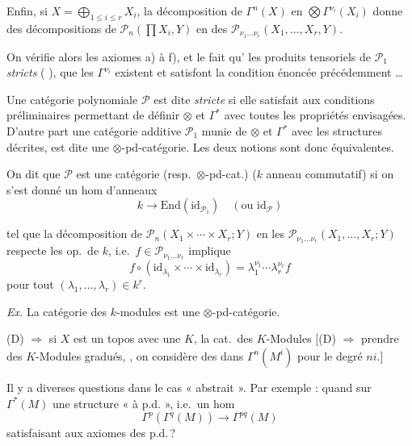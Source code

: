 \documentclass[11pt,a4paper]{article}
\begin{document}
Enfin, si $X = \bigoplus_{1 \leq i \leq r} X_i$, la décomposition de
$\Gamma^{n}(X)$ en  $\bigotimes \Gamma^{\nu_i}(X_i)$ donne
 des décompositions de $\mathcal{P}_n(\prod X_i, Y)$ en des
$\mathcal{P}_{\nu_1 \ldots \nu_r}(X_1, \ldots, X_r, Y)$.

On vérifie alors les axiomes a) à f), et le fait qu'
les produits tensoriels de $\mathcal{P}_1$  \emph{stricts}
\ill{} (\ill{} ), que les $\Gamma^{\nu_i}$ existent et
satisfont la condition énoncée précédemment \ldots
{}

Une catégorie polynomiale $\mathcal{P}$ est dite \emph{stricte} si elle
satisfait aux conditions préliminaires permettant de définir $\otimes$ et
$\Gamma^{*}$ avec toutes les propriétés envisagées. D'autre part une
catégorie additive $\mathcal{P}_1$ munie de $\otimes$ et $\Gamma^{*}$ avec les
structures décrites, est dite une $\otimes$-pd-catégorie. Les deux notions
sont donc équivalentes.

On dit que $\mathcal{P}$ est \struck{\ill{}} une catégorie
 (resp.\ $\otimes$-pd-cat.)
 ($k$ anneau commutatif) si on s'est donné un hom
d'anneaux
\[
k \to \mathrm{End}(\mathrm{id}_{\mathcal{P}_1}) \quad
(\text{ou } \mathrm{id}_{\mathcal{P}})
\]

tel que la décomposition de
$\mathcal{P}_n(X_1 \times \cdots \times X_r; Y)$ en les
$\mathcal{P}_{\nu_1 \ldots \nu_r}(X_1, \ldots, X_r; Y)$ respecte les op.\ de
$k$, i.e.\ $f \in \mathcal{P}_{\nu_1 \ldots \nu_r}$ implique
\[
f \circ (\mathrm{id}_{\lambda_1} \times \cdots \times \mathrm{id}_{\lambda_r})
= \lambda_1^{\nu_1} \cdots \lambda_r^{\nu_r} f
\]
pour tout $(\lambda_1, \ldots, \lambda_r) \in k^{r}$.

\emph{Ex.} La catégorie des $k$-modules est une $\otimes$-pd-catégorie.

(D) $\Rightarrow$ si $X$ est un topos avec une  $K$, la
cat.\ des $K$-Modules
\struck{\ill{}} [(D) $\Rightarrow$  prendre des $K$-Modules
gradués, 
, on considère des \ill{} dans
$\Gamma^{n}(M^{i})$ pour le degré $ni$.]

Il y a diverses questions dans le cas « abstrait ». Par exemple : quand
 
\ill{} sur $\Gamma^{*}(M)$ une structure « à p.d. », i.e.\ un hom
 \ill{}
\[
\Gamma^{p}(\Gamma^{q}(M)) \longrightarrow \Gamma^{pq}(M)
\]
satisfaisant aux axiomes des p.d.\,?
\end{document}
